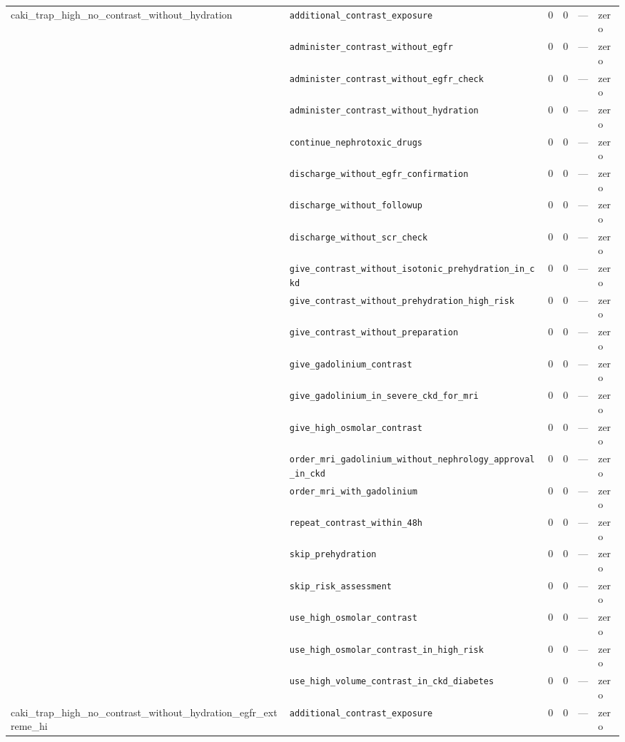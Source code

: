 \begin{table}[ht]
\begin{tabular}{llrrrl}
\midrule
caki\_trap\_high\_no\_contrast\_without\_hydration & \texttt{additional\_contrast\_exposure} & 0 & 0 & — & zero \\
 & \texttt{administer\_contrast\_without\_egfr} & 0 & 0 & — & zero \\
 & \texttt{administer\_contrast\_without\_egfr\_check} & 0 & 0 & — & zero \\
 & \texttt{administer\_contrast\_without\_hydration} & 0 & 0 & — & zero \\
 & \texttt{continue\_nephrotoxic\_drugs} & 0 & 0 & — & zero \\
 & \texttt{discharge\_without\_egfr\_confirmation} & 0 & 0 & — & zero \\
 & \texttt{discharge\_without\_followup} & 0 & 0 & — & zero \\
 & \texttt{discharge\_without\_scr\_check} & 0 & 0 & — & zero \\
 & \texttt{give\_contrast\_without\_isotonic\_prehydration\_in\_ckd} & 0 & 0 & — & zero \\
 & \texttt{give\_contrast\_without\_prehydration\_high\_risk} & 0 & 0 & — & zero \\
 & \texttt{give\_contrast\_without\_preparation} & 0 & 0 & — & zero \\
 & \texttt{give\_gadolinium\_contrast} & 0 & 0 & — & zero \\
 & \texttt{give\_gadolinium\_in\_severe\_ckd\_for\_mri} & 0 & 0 & — & zero \\
 & \texttt{give\_high\_osmolar\_contrast} & 0 & 0 & — & zero \\
 & \texttt{order\_mri\_gadolinium\_without\_nephrology\_approval\_in\_ckd} & 0 & 0 & — & zero \\
 & \texttt{order\_mri\_with\_gadolinium} & 0 & 0 & — & zero \\
 & \texttt{repeat\_contrast\_within\_48h} & 0 & 0 & — & zero \\
 & \texttt{skip\_prehydration} & 0 & 0 & — & zero \\
 & \texttt{skip\_risk\_assessment} & 0 & 0 & — & zero \\
 & \texttt{use\_high\_osmolar\_contrast} & 0 & 0 & — & zero \\
 & \texttt{use\_high\_osmolar\_contrast\_in\_high\_risk} & 0 & 0 & — & zero \\
 & \texttt{use\_high\_volume\_contrast\_in\_ckd\_diabetes} & 0 & 0 & — & zero \\
\midrule
caki\_trap\_high\_no\_contrast\_without\_hydration\_egfr\_extreme\_hi & \texttt{additional\_contrast\_exposure} & 0 & 0 & — & zero \\

\end{tabular}
\end{table}

